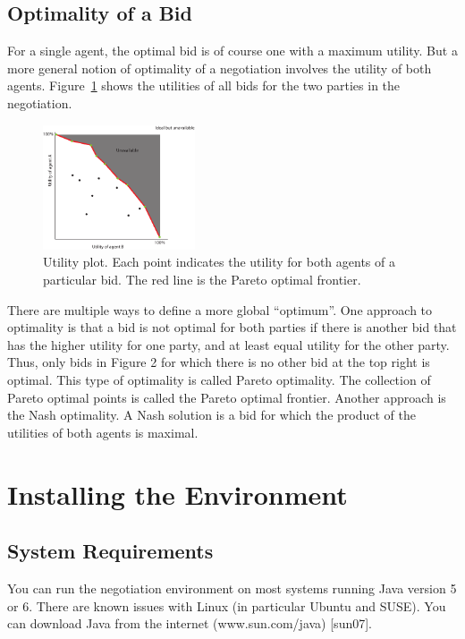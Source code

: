\documentclass[]{article}
\begin{document}
\subsection{Optimality of a Bid}
For a single agent, the optimal bid is of course one with a maximum utility. But a more general notion of optimality of a negotiation involves the utility of both agents. Figure~\ref{Fig:utility plot} shows the utilities of all bids for the two parties in the negotiation. 
 
\begin{figure}[htb]
	\centering
	\includegraphics[width=0.4\textwidth]{media/image5.pdf}
\caption{Utility plot. Each point indicates the utility for both agents of a particular bid. The red line is the Pareto optimal frontier.}\label{Fig:utility plot}
\end{figure}

There are multiple ways to define a more global ``optimum''. One approach to optimality is that a bid is not optimal for both parties if there is another bid that has the higher utility for one party, and at least equal utility for the other party. Thus, only bids in Figure 2 for which there is no other bid at the top right is optimal. This type of optimality is called Pareto optimality. The collection of Pareto optimal points is called the Pareto optimal frontier. Another approach is the Nash optimality. A Nash solution is a bid for which the product of the utilities of both agents is maximal. 
 
\section{Installing the Environment}

\subsection{System Requirements}
You can run the negotiation environment on most systems running Java version 5 or 6. There are known issues with Linux (in particular Ubuntu and SUSE). You can download Java from the internet (www.sun.com/java) [sun07]. 
\end{document}
